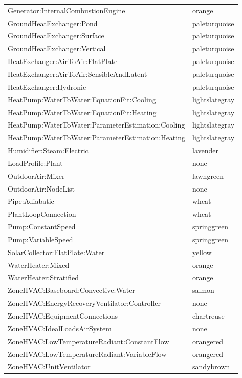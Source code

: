 \begin{longtable}[c]{@{}ll@{}}
Generator:InternalCombustionEngine & orange \tabularnewline
GroundHeatExchanger:Pond & paleturquoise \tabularnewline
GroundHeatExchanger:Surface & paleturquoise \tabularnewline
GroundHeatExchanger:Vertical & paleturquoise \tabularnewline
HeatExchanger:AirToAir:FlatPlate & paleturquoise \tabularnewline
HeatExchanger:AirToAir:SensibleAndLatent & paleturquoise \tabularnewline
HeatExchanger:Hydronic & paleturquoise \tabularnewline
HeatPump:WaterToWater:EquationFit:Cooling & lightslategray \tabularnewline
HeatPump:WaterToWater:EquationFit:Heating & lightslategray \tabularnewline
HeatPump:WaterToWater:ParameterEstimation:Cooling & lightslategray \tabularnewline
HeatPump:WaterToWater:ParameterEstimation:Heating & lightslategray \tabularnewline
Humidifier:Steam:Electric & lavender \tabularnewline
LoadProfile:Plant & none \tabularnewline
OutdoorAir:Mixer & lawngreen \tabularnewline
OutdoorAir:NodeList & none \tabularnewline
Pipe:Adiabatic & wheat \tabularnewline
PlantLoopConnection & wheat \tabularnewline
Pump:ConstantSpeed & springgreen \tabularnewline
Pump:VariableSpeed & springgreen \tabularnewline
SolarCollector:FlatPlate:Water & yellow \tabularnewline
WaterHeater:Mixed & orange \tabularnewline
WaterHeater:Stratified & orange \tabularnewline
ZoneHVAC:Baseboard:Convective:Water & salmon \tabularnewline
ZoneHVAC:EnergyRecoveryVentilator:Controller & none \tabularnewline
ZoneHVAC:EquipmentConnections & chartreuse \tabularnewline
ZoneHVAC:IdealLoadsAirSystem & none \tabularnewline
ZoneHVAC:LowTemperatureRadiant:ConstantFlow & orangered \tabularnewline
ZoneHVAC:LowTemperatureRadiant:VariableFlow & orangered \tabularnewline
ZoneHVAC:UnitVentilator & sandybrown \tabularnewline
\bottomrule
\end{longtable}

